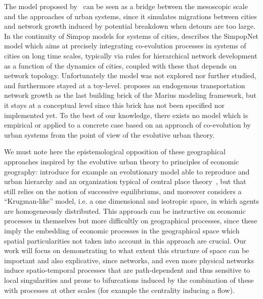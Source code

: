 \documentclass[11pt]{article}
\begin{document}
The model proposed by~\cite{blumenfeld2010network} can be seen as a bridge between the mesoscopic scale and the approaches of urban systems, since it simulates migrations between cities and network growth induced by potential breakdown when detours are too large. In the continuity of Simpop models for systems of cities, \cite{schmitt2014modelisation} describes the SimpopNet model which aims at precisely integrating co-evolution processes in systems of cities on long time scales, typically via rules for hierarchical network development as a function of the dynamics of cities, coupled with these that depends on network topology. Unfortunately the model was not explored nor further studied, and furthermore stayed at a toy-level. \cite{cottineau2014evolution} proposes an endogenous transportation network growth as the last building brick of the Marius modeling framework, but it stays at a conceptual level since this brick has not been specified nor implemented yet. To the best of our knowledge, there exists no model which is empirical or applied to a concrete case based on an approach of co-evolution by urban systems from the point of view of the evolutive urban theory.

We must note here the epistemological opposition of these geographical approaches inspired by the evolutive urban theory \citep{pumain1997pour} to principles of economic geography: \cite{fujita1999evolution} introduce for example an evolutionary model able to reproduce and urban hierarchy and an organization typical of central place theory~\citep{banos2011christaller}, but that still relies on the notion of successive equilibriums, and moreover considers a ``Krugman-like'' model, i.e. a one dimensional and isotropic space, in which agents are homogeneously distributed. This approach can be instructive on economic processes in themselves but more difficultly on geographical processes, since these imply the embedding of economic processes in the geographical space which spatial particularities not taken into account in this approach are crucial. Our work will focus on demonstrating to what extent this structure of space can be important and also explicative, since networks, and even more physical networks induce spatio-temporal processes that are path-dependent and thus sensitive to local singularities and prone to bifurcations induced by the combination of these with processes at other scales (for example the centrality inducing a flow).
\end{document}
